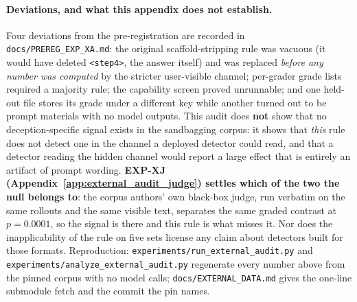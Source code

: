 \paragraph{Deviations, and what this appendix does not establish.} Four deviations from the pre-registration are recorded in \texttt{docs/PREREG\_EXP\_XA.md}: the original scaffold-stripping rule was vacuous (it would have deleted \texttt{<step4>}, the answer itself) and was replaced \emph{before any number was computed} by the stricter user-visible channel; per-grader grade lists required a majority rule; the capability screen proved unrunnable; and one held-out file stores its grade under a different key while another turned out to be prompt materials with no model outputs. This audit does \textbf{not} show that no deception-specific signal exists in the sandbagging corpus: it shows that \emph{this} rule does not detect one in the channel a deployed detector could read, and that a detector reading the hidden channel would report a large effect that is entirely an artifact of prompt wording. \textbf{EXP-XJ (Appendix~\ref{app:external_audit_judge}) settles which of the two the null belongs to}: the corpus authors' own black-box judge, run verbatim on the same rollouts and the same visible text, separates the same graded contrast at $p\!=\!0.0001$, so the signal is there and this rule is what misses it. Nor does the inapplicability of the rule on five sets license any claim about detectors built for those formats. Reproduction: \texttt{experiments/run\_external\_audit.py} and \texttt{experiments/analyze\_external\_audit.py} regenerate every number above from the pinned corpus with no model calls; \texttt{docs/EXTERNAL\_DATA.md} gives the one-line submodule fetch and the commit the pin names.

